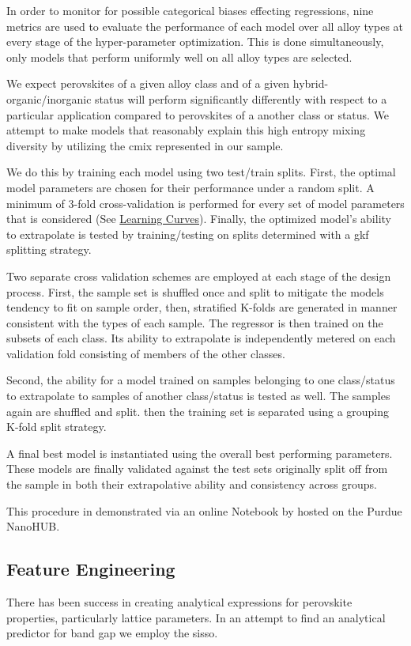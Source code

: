 \documentclass[aip, jmp, amsmath, amssymb, nofootinbib]{revtex4-2}
\begin{document}
In order to monitor for possible categorical biases effecting
regressions, nine metrics are used to evaluate the performance of each
model over all alloy types at every stage of the hyper-parameter
optimization. This is done simultaneously, only models that perform
uniformly well on all alloy types are selected.

We expect perovskites of a given alloy class and of a given
hybrid-organic/inorganic status will perform significantly differently
with respect to a particular application compared to perovskites of a
another class or status. We attempt to make models that reasonably
explain this high entropy mixing diversity by utilizing the \gls{cmix} represented in our sample.

We do this by training each model using two test/train splits. First,
the optimal model parameters are chosen for their performance under a
random split. A minimum of 3-fold cross-validation is performed for
every set of model parameters that is considered (See \hyperref[sec:orgfb4edce]{Learning Curves}). Finally, the optimized model's ability to extrapolate is
tested by training/testing on splits determined with a \gls{gkf} splitting strategy.

Two separate cross validation schemes are employed at each stage of
the design process. First, the sample set is shuffled once and split
to mitigate the models tendency to fit on sample order, then,
stratified K-folds are generated in manner consistent with the types
of each sample. The regressor is then trained on the subsets of each
class. Its ability to extrapolate is independently metered on each
validation fold consisting of members of the other classes.

Second, the ability for a model trained on samples belonging to one
class/status to extrapolate to samples of another class/status is
tested as well. The samples again are shuffled and split. then the
training set is separated using a grouping K-fold split strategy.

A final best model is instantiated using the overall best performing
parameters. These models are finally validated against the test sets
originally split off from the sample in both their extrapolative
ability and consistency across groups.

This procedure in demonstrated via an online Notebook by
\citet{manganaris-2022-mrs-comput} hosted on the Purdue NanoHUB.

\subsection*{Feature Engineering}
\label{sec:org842491d}
There has been success in creating analytical expressions for
perovskite properties, particularly lattice
parameters\cite{jiang-2006-predic-lattic}. In an attempt to find an
analytical predictor for band gap we employ the \Acrfull{sisso}\cite{ouyang-2018-sisso}.
\end{document}
